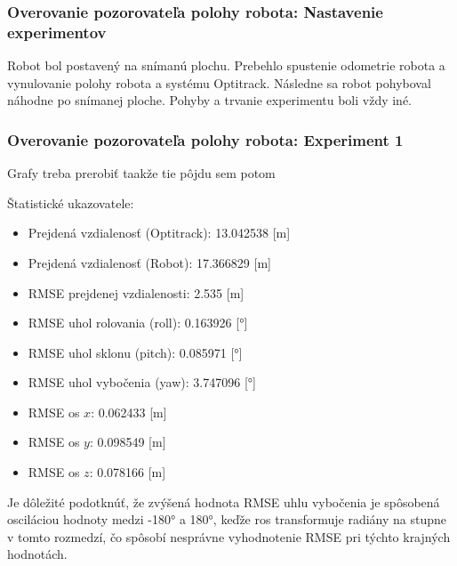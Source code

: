 \newpage\subsubsection{Overovanie pozorovateľa polohy robota: Nastavenie experimentov}
Robot bol postavený na snímanú plochu. Prebehlo spustenie odometrie robota a vynulovanie polohy robota a systému Optitrack.\newline
Následne sa robot pohyboval náhodne po snímanej ploche. Pohyby a trvanie experimentu boli vždy iné.

\subsubsection{Overovanie pozorovateľa polohy robota: Experiment 1}
\begin{center}
    Grafy treba prerobiť taakže tie pôjdu sem potom
\end{center}
Štatistické ukazovatele:
\begin{itemize}
    \item Prejdená vzdialenosť (Optitrack): 13.042538 [m]
    \item Prejdená vzdialenosť (Robot): 17.366829 [m]
    \item RMSE prejdenej vzdialenosti: 2.535 [m]
    \item RMSE uhol rolovania (roll): 0.163926 [°]
    \item RMSE uhol sklonu (pitch): 0.085971 [°]
    \item RMSE uhol vybočenia (yaw): 3.747096 [°] 
    \item RMSE os $x$: 0.062433 [m]
    \item RMSE os $y$: 0.098549 [m]
    \item RMSE os $z$: 0.078166 [m]
\end{itemize}
Je dôležité podotknúť, že zvýšená hodnota RMSE uhlu vybočenia je spôsobená osciláciou hodnoty medzi -180° a 180°, keďže \acrshort{ros} transformuje radiány na stupne v tomto rozmedzí, čo spôsobí nesprávne vyhodnotenie RMSE pri týchto krajných hodnotách.

